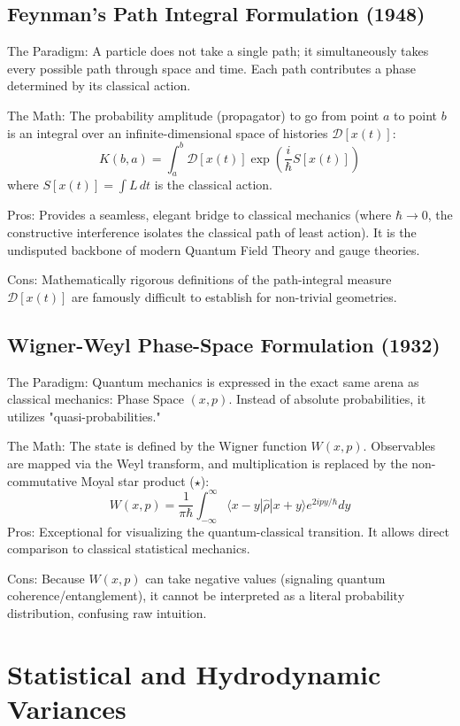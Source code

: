 \subsection{Feynman’s Path Integral Formulation (1948)}

The Paradigm: A particle does not take a single path; it simultaneously 
takes every possible path through space and time. Each path contributes a 
phase determined by its classical action.

The Math: The probability amplitude (propagator) to go from point $a$ to 
point $b$ is an integral over an infinite-dimensional space of histories
$\mathcal{D}[x(t)]$:
$$K(b, a) = \int_{a}^{b} \mathcal{D}[x(t)] \exp\left(\frac{i}{\hbar} S[x(t)]\right)$$
where $S[x(t)] = \int L \, dt$ is the classical action.

Pros: Provides a seamless, elegant bridge to classical mechanics 
(where $\hbar \to 0$, the constructive interference isolates the classical
path of least action). It is the undisputed backbone of modern Quantum 
Field Theory and gauge theories.

Cons: Mathematically rigorous definitions of the path-integral measure 
$\mathcal{D}[x(t)]$ are famously difficult to establish for non-trivial 
geometries.

\subsection{Wigner-Weyl Phase-Space Formulation (1932)}

The Paradigm: Quantum mechanics is expressed in the exact same arena as 
classical mechanics: Phase Space $(x, p)$. Instead of absolute probabilities,
it utilizes "quasi-probabilities."

The Math: The state is defined by the Wigner function $W(x,p)$. 
Observables are mapped via the Weyl transform, and multiplication is 
replaced by the non-commutative Moyal star product ($\star$):
$$W(x,p) = \frac{1}{\pi\hbar}\int_{-\infty}^{\infty} 
\langle x-y| \hat{\rho} |x+y\rangle e^{2ipy/\hbar} dy$$
Pros: Exceptional for visualizing the quantum-classical transition. 
It allows direct comparison to classical statistical mechanics.

Cons: Because $W(x,p)$ can take negative values (signaling quantum 
coherence/entanglement), it cannot be interpreted as a literal 
probability distribution, confusing raw intuition.
\section{Statistical and Hydrodynamic Variances}
